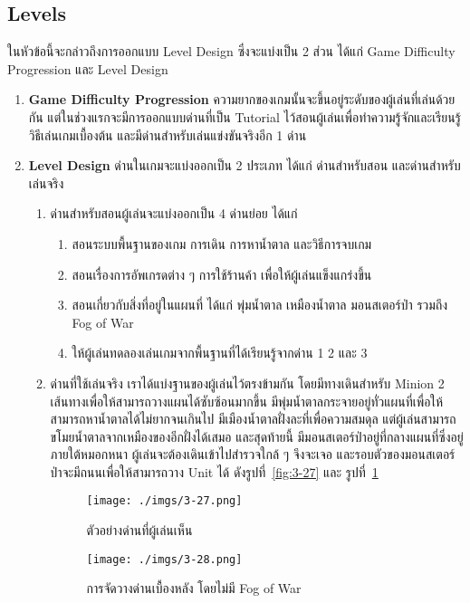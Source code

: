 \documentclass[12pt,oneside,openright,a4paper]{cpe-thai-project}
\begin{document}
\subsection{Levels}
ในหัวข้อนี้จะกล่าวถึงการออกแบบ Level Design ซึ่งจะแบ่งเป็น 2 ส่วน 
ได้แก่ Game Difficulty Progression และ Level Design
\begin{enumerate}
  \item \textbf{Game Difficulty Progression}
  ความยากของเกมนั้นจะขึ้นอยู่ระดับของผู้เล่นที่เล่นด้วยกัน แต่ในช่วงแรกจะมีการออกแบบด่านที่เป็น 
  Tutorial ไว้สอนผู้เล่นเพื่อทำความรู้จักและเรียนรู้วิธีเล่นเกมเบื้องต้น 
  และมีด่านสำหรับเล่นแข่งขันจริงอีก 1 ด่าน

  \item \textbf{Level Design}
  ด่านในเกมจะแบ่งออกเป็น 2 ประเภท ได้แก่ ด่านสำหรับสอน และด่านสำหรับเล่นจริง
  \begin{enumerate}
    \item ด่านสำหรับสอนผู้เล่นจะแบ่งออกเป็น 4 ด่านย่อย ได้แก่
    \begin{enumerate}
      \item สอนระบบพื้นฐานของเกม การเดิน การหาน้ำตาล และวิธีการจบเกม
      \item สอนเรื่องการอัพเกรดต่าง ๆ การใช้ร้านค้า เพื่อให้ผู้เล่นแข็งแกร่งขึ้น
      \item สอนเกี่ยวกับสิ่งที่อยู่ในแผนที่ ได้แก่ พุ่มน้ำตาล เหมืองน้ำตาล มอนสเตอร์ป่า รวมถึง Fog of War
      \item ให้ผู้เล่นทดลองเล่นเกมจากพื้นฐานที่ได้เรียนรู้จากด่าน 1 2 และ 3
    \end{enumerate}

    \item ด่านที่ใช้เล่นจริง เราได้แบ่งฐานของผู้เล่นไว้ตรงข้ามกัน 
    โดยมีทางเดินสำหรับ Minion 2 เส้นทางเพื่อให้สามารถวางแผนได้ซับซ้อนมากขึ้น 
    มีพุ่มน้ำตาลกระจายอยู่ทั่วแผนที่เพื่อให้สามารถหาน้ำตาลได้ไม่ยากจนเกินไป 
    มีเมืองน้ำตาลฝั่งละที่เพื่อความสมดุล แต่ผู้เล่นสามารถขโมยน้ำตาลจากเหมืองของอีกฝั่งได้เสมอ 
    และสุดท้ายนี้ มีมอนสเตอร์ป่าอยู่ที่กลางแผนที่ซึ่งอยู่ภายใต้หมอกหนา 
    ผู้เล่นจะต้องเดินเข้าไปสำรวจใกล้ ๆ จึงจะเจอ 
    และรอบตัวของมอนสเตอร์ป่าจะมีถนนเพื่อให้สามารถวาง Unit ได้ ดังรูปที่~\ref{fig:3-27} และ รูปที่~\ref{fig:3-28}

    \begin{figure}[H]\centering
      \begin{minipage}{.45\textwidth}
        \centering
        \texttt{[image: ./imgs/3-27.png]}
        \caption{ตัวอย่างด่านที่ผู้เล่นเห็น}\label{fig:3-27}
      \end{minipage}
      \begin{minipage}{.45\textwidth}
        \centering
        \texttt{[image: ./imgs/3-28.png]}
        \caption{การจัดวางด่านเบื้องหลัง โดยไม่มี Fog of War}\label{fig:3-28}
      \end{minipage}
    \end{figure}
  \end{enumerate}
\end{enumerate}
\end{document}
